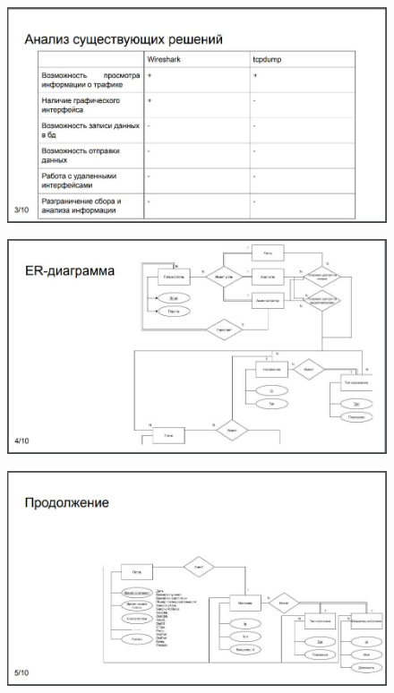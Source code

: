 \begin{figure}[H]
	\centering
	\includegraphics[scale=0.35]{pr3.jpg}
\end{figure}
\begin{figure}[H]
	\centering
	\includegraphics[scale=0.35]{pr4.jpg}
\end{figure}
\begin{figure}[H]
	\centering
	\includegraphics[scale=0.35]{pr5.jpg}
\end{figure}
